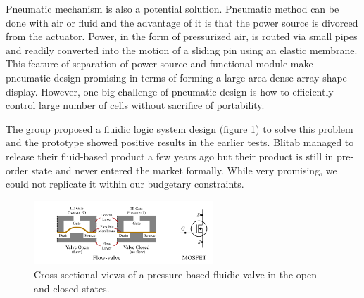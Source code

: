 Pneumatic mechanism is also a potential solution. Pneumatic method can be done with air or fluid and the advantage of it is that the power source is divorced from the actuator.
Power, in the form of pressurized air, is routed via small pipes and readily converted into the motion of a sliding pin using an elastic membrane.
This feature of separation of power source and functional module make pneumatic design promising in terms of forming a large-area dense array shape display.
However, one big challenge of pneumatic design is how to efficiently control large number of cells without sacrifice of portability.

The group proposed a fluidic logic system design (figure \ref{fig:pneumatic-schema}) to solve this problem and the prototype showed positive results in the earlier tests.
Blitab managed to release their fluid-based product a few years ago but their product is still in pre-order state and never entered the market formally.
While very promising, we could not replicate it within our budgetary constraints.
\begin{figure}\centering
    \includegraphics[width=0.6\textwidth]{figures/pneumatic-schema.png}
\caption{Cross-sectional views of a pressure-based fluidic valve in the open and closed states.}
\label{fig:pneumatic-schema}
\end{figure}